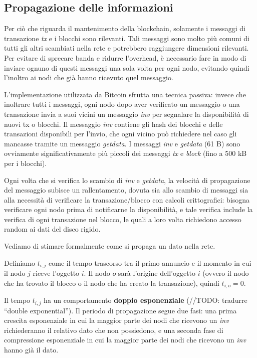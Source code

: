 \subsection{Propagazione delle
informazioni}\label{propagazione-delle-informazioni}

Per ciò che riguarda il mantenimento della blockchain, solamente i
messaggi di transazione \emph{tx} e i blocchi sono rilevanti. Tali
messaggi sono molto più comuni di tutti gli altri scambiati nella rete e
potrebbero raggiungere dimensioni rilevanti. Per evitare di sprecare
banda e ridurre l'overhead, è necessario fare in modo di inviare ognuno
di questi messaggi una sola volta per ogni nodo, evitando quindi
l'inoltro ai nodi che già hanno ricevuto quel messaggio.

L'implementazione utilizzata da Bitcoin sfrutta una tecnica passiva:
invece che inoltrare tutti i messaggi, ogni nodo dopo aver verificato un
messaggio o una transazione invia a suoi vicini un messaggio \emph{inv}
per segnalare la disponibilità di nuovi tx o blocchi. Il messaggio
\emph{inv} contiene gli hash dei blocchi e delle transazioni disponibili
per l'invio, che ogni vicino può richiedere nel caso gli mancasse
tramite un messaggio \emph{getdata}. I messaggi \emph{inv} e
\emph{getdata} (61 B) sono ovviamente significativamente più piccoli dei
messaggi \emph{tx} e \emph{block} (fino a 500 kB per i blocchi).

Ogni volta che si verifica lo scambio di \emph{inv} e \emph{getdata}, la
velocità di propagazione del messaggio subisce un rallentamento, dovuta
sia allo scambio di messaggi sia alla necessità di verificare la
transazione/blocco con calcoli crittografici: bisogna verificare ogni
nodo prima di notificarne la disponibilità, e tale verifica include la
verifica di ogni transazione nel blocco, le quali a loro volta
richiedono accesso random ai dati del disco rigido.

Vediamo di stimare formalmente come si propaga un dato nella rete.

Definiamo $t_{i,j}$ come il tempo trascorso tra il primo annuncio e il
momento in cui il nodo $j$ riceve l'oggetto $i$. Il nodo $o$ sarà
l'origine dell'oggetto $i$ (ovvero il nodo che ha trovato il blocco o il
nodo che ha creato la transazione), quindi $t_{i,o}=0$.

Il tempo $t_{i,j}$ ha un comportamento \textbf{doppio esponenziale}
(//TODO: tradurre ``double exponential''). Il periodo di propagazione
segue due fasi: una prima crescita esponenziale in cui la maggior parte
dei nodi che ricevono un \emph{inv} richiederanno il relativo dato che
non possiedono, e una seconda fase di compressione esponenziale in cui
la maggior parte dei nodi che ricevono un \emph{inv} hanno già il dato.

